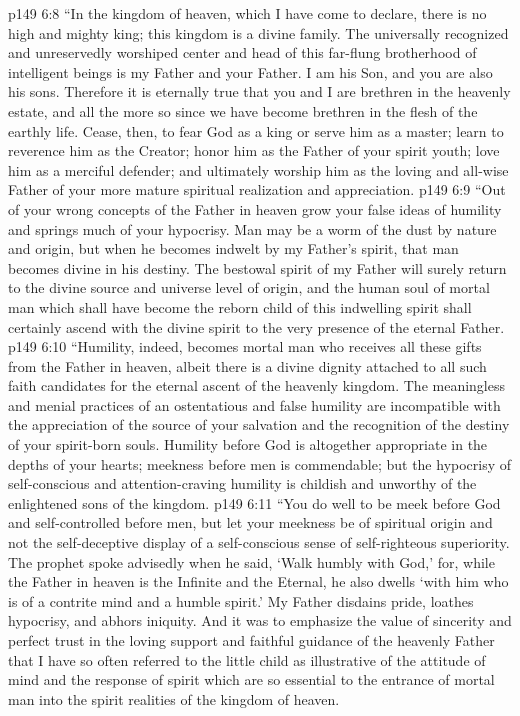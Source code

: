 \vs p149 6:8 \textcolor{ubdarkred}{“In the kingdom of heaven, which I have come to declare, there is no high and mighty king; this kingdom is a divine family. The universally recognized and unreservedly worshiped center and head of this far\hyp{}flung brotherhood of intelligent beings is my Father and your Father. I am his Son, and you are also his sons. Therefore it is eternally true that you and I are brethren in the heavenly estate, and all the more so since we have become brethren in the flesh of the earthly life. Cease, then, to fear God as a king or serve him as a master; learn to reverence him as the Creator; honor him as the Father of your spirit youth; love him as a merciful defender; and ultimately worship him as the loving and all\hyp{}wise Father of your more mature spiritual realization and appreciation.}
\vs p149 6:9 \textcolor{ubdarkred}{“Out of your wrong concepts of the Father in heaven grow your false ideas of humility and springs much of your hypocrisy. Man may be a worm of the dust by nature and origin, but when he becomes indwelt by my Father’s spirit, that man becomes divine in his destiny. The bestowal spirit of my Father will surely return to the divine source and universe level of origin, and the human soul of mortal man which shall have become the reborn child of this indwelling spirit shall certainly ascend with the divine spirit to the very presence of the eternal Father.}
\vs p149 6:10 \textcolor{ubdarkred}{“Humility, indeed, becomes mortal man who receives all these gifts from the Father in heaven, albeit there is a divine dignity attached to all such faith candidates for the eternal ascent of the heavenly kingdom. The meaningless and menial practices of an ostentatious and false humility are incompatible with the appreciation of the source of your salvation and the recognition of the destiny of your spirit\hyp{}born souls. Humility before God is altogether appropriate in the depths of your hearts; meekness before men is commendable; but the hypocrisy of self\hyp{}conscious and attention\hyp{}craving humility is childish and unworthy of the enlightened sons of the kingdom.}
\vs p149 6:11 \textcolor{ubdarkred}{“You do well to be meek before God and self\hyp{}controlled before men, but let your meekness be of spiritual origin and not the self\hyp{}deceptive display of a self\hyp{}conscious sense of self\hyp{}righteous superiority. The prophet spoke advisedly when he said, ‘Walk humbly with God,’ for, while the Father in heaven is the Infinite and the Eternal, he also dwells ‘with him who is of a contrite mind and a humble spirit.’ My Father disdains pride, loathes hypocrisy, and abhors iniquity. And it was to emphasize the value of sincerity and perfect trust in the loving support and faithful guidance of the heavenly Father that I have so often referred to the little child as illustrative of the attitude of mind and the response of spirit which are so essential to the entrance of mortal man into the spirit realities of the kingdom of heaven.}
